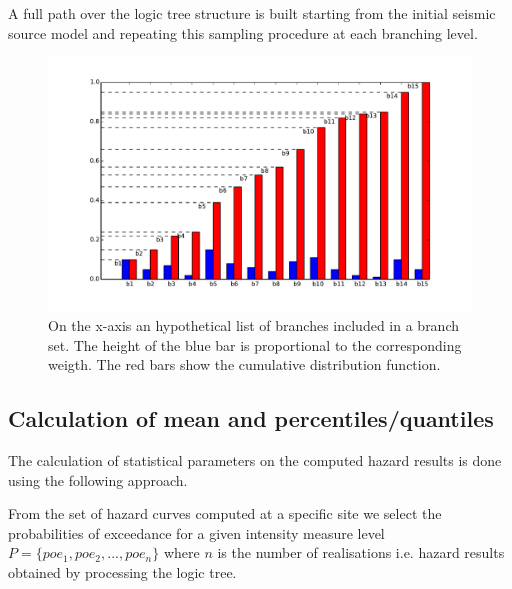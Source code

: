 A full path over the logic tree structure is built starting from the 
initial seismic source model and repeating this sampling procedure 
at each branching level.
%
\begin{figure}[ht]
\centering
\includegraphics[trim = 20mm 5mm 5mm 10mm, clip, width=14cm]
    {./Pictures/lts/histogram_mc_sampl.pdf}
\caption{On the x-axis an hypothetical list of branches 
    included in a branch set. The height of the blue bar is proportional to 
    the corresponding weigth. The red bars show the cumulative distribution 
    function.}
\label{fig:logic_tree_mc_samp}
\end{figure}
%
\subsection{Calculation of mean and percentiles/quantiles}
The calculation of statistical parameters on the computed hazard results
is done using the following approach.

From the set of hazard curves computed at a specific site we select 
the probabilities of exceedance for a given intensity measure level
$P=\{poe_1, poe_2, ..., poe_n\}$ where $n$ is the number of realisations
i.e. hazard results obtained by processing the logic tree.

